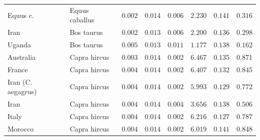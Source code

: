 \documentclass{article}
\begin{document}
\begin{center}
\begin{longtable*}{|l|l|r|r|r|r|r|r|}
            \bottomrule
            \endlastfoot
             Equus c. &      Equus caballus &               $ 0.002$ &              $ 0.014$ &              $ 0.006$ &                                          $ 2.230$ &                         $ 0.141$ &                      $ 0.316$ \\
            Iran &          Bos taurus &               $ 0.002$ &              $ 0.013$ &              $ 0.006$ &                                          $ 2.200$ &                         $ 0.136$ &                      $ 0.298$ \\
            Uganda &          Bos taurus &               $ 0.005$ &              $ 0.013$ &              $ 0.011$ &                                          $ 1.177$ &                         $ 0.138$ &                      $ 0.162$ \\
             Australia &        Capra hircus &               $ 0.003$ &              $ 0.014$ &              $ 0.002$ &                                          $ 6.467$ &                         $ 0.135$ &                      $ 0.871$ \\
             France &        Capra hircus &               $ 0.004$ &              $ 0.014$ &              $ 0.002$ &                                          $ 6.407$ &                         $ 0.132$ &                      $ 0.845$ \\
             Iran (C. aegagrus) &        Capra hircus &               $ 0.004$ &              $ 0.014$ &              $ 0.002$ &                                          $ 5.993$ &                         $ 0.129$ &                      $ 0.772$ \\
             Iran &        Capra hircus &               $ 0.004$ &              $ 0.014$ &              $ 0.004$ &                                          $ 3.656$ &                         $ 0.138$ &                      $ 0.506$ \\
             Italy &        Capra hircus &               $ 0.004$ &              $ 0.014$ &              $ 0.002$ &                                          $ 6.216$ &                         $ 0.127$ &                      $ 0.787$ \\
             Morocco &        Capra hircus &               $ 0.004$ &              $ 0.014$ &              $ 0.002$ &                                          $ 6.019$ &                         $ 0.141$ &                      $ 0.848$ \\

\end{longtable*}
\end{center}
\end{document}

